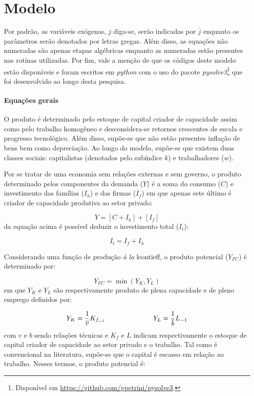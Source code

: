 \section{Modelo}
\label{SecModelo}

Por padrão, as variáveis exógenas, $j$ diga-se, serão indicadas por $\overline{j}$ enquanto os parâmetros serão denotados por letras gregas. Além disso, as equações não numeradas são apenas etapas algébricas enquanto as numeradas estão presentes nas rotinas utilizadas. Por fim, vale a menção de que os códigos deste modelo estão disponíveis e foram escritos em \textit{python} com o uso do pacote \textit{pysolve3}\footnote{
	Disponível em \url{https://github.com/gpetrini/pysolve3}.
} que foi desenvolvido ao longo desta pesquisa.

\paragraph*{Equações gerais}

O produto é determinado pelo estoque de capital criador de capacidade assim como pelo trabalho homogêneo e desconsidera-se retornos crescentes de escala e progresso tecnológico.
Além disso, supõe-se que não estão presentes inflação de bens bem como depreciação.  
Ao longo do modelo, supõe-se que existem duas classes sociais: capitalistas (denotados pelo subíndice $k$) e trabalhadores ($w$).

Por se tratar de uma economia sem relações externas e sem governo, o produto determinado pelos componentes da demanda ($Y$) é a soma do consumo ($C$) e investimento das famílias ($I_h$) e das firmas ($I_f$) em que apenas este último é criador de capacidade produtiva ao setor privado:

\begin{equation}
\label{_Y}
    Y = [C + I_h] + [I_f]
\end{equation}
da equação acima é possível deduzir o investimento total ($I_t$):

\begin{equation}
\label{_It}
    I_t = I_f + I_h
\end{equation}

Considerando uma função de produção \textit{à la} leontieff, o produto potencial ($Y_{FC}$) é determinado por:

$$
Y_{FC} = \min (Y_K, Y_L)
$$
em que $Y_K$ e $Y_L$ são respectivamente produto de plena capacidade e de pleno emprego definidos por:

$$
Y_K = \frac{1}{\overline v}K_{f_{-1}} \hspace{2.5cm} Y_L = \frac{1}{\overline b}L_{-1}
$$
com $v$ e $b$ sendo relações técnicas e $K_f$ e $L$ indicam respectivamente o estoque de capital criador de capacidade ao setor privado e  o trabalho. Tal como é convencional na literatura, supõe-se que o capital é escasso em relação ao trabalho. Nesses termos, o produto potencial é:


